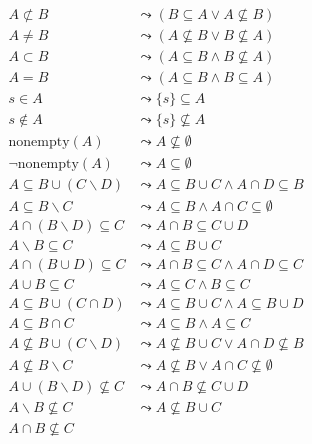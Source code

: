 \documentclass{article}
\begin{document}
\begin{figure}[htbp]
\begin{center}
\begin{align*}
A \not\subset B &\leadsto (B \subseteq A \lor A \not\subseteq B) \\
A \not= B       &\leadsto (A \not\subseteq B \lor B \not\subseteq A) \\
A \subset B     &\leadsto (A \subseteq B \land B \not\subseteq A) \\
A = B           &\leadsto (A \subseteq B \land B \subseteq A) \\
s \in A         &\leadsto \{ s \} \subseteq A \\
s \not\in A     &\leadsto \{ s \} \not\subseteq A \\
\text{nonempty}(A)          &\leadsto A \not\subseteq \emptyset \\
\lnot \text{nonempty}(A)    &\leadsto A \subseteq \emptyset \\
A \subseteq B \cup (C \backslash D)
    &\leadsto A \subseteq B \cup C \land A \cap D \subseteq B \\
A \subseteq B \backslash C
    &\leadsto A \subseteq B \land A \cap C \subseteq \emptyset \\
A \cap (B \backslash D) \subseteq C
    &\leadsto A \cap B \subseteq C \cup D \\
A \backslash B \subseteq C
    &\leadsto A \subseteq B \cup C \\
A \cap (B \cup D) \subseteq C
    & \leadsto A \cap B \subseteq C \land A \cap D \subseteq C \\
A \cup B \subseteq C
    & \leadsto A \subseteq C \land B \subseteq C \\
A \subseteq B \cup (C \cap D)
    & \leadsto A \subseteq B \cup C \land A \subseteq B \cup D \\
A \subseteq B \cap C
    & \leadsto A \subseteq B \land A \subseteq C \\
A \not\subseteq B \cup (C \backslash D)
    &\leadsto A \not\subseteq B \cup C \lor A \cap D \not\subseteq B \\
A \not\subseteq B \backslash C
    &\leadsto A \not\subseteq B \lor A \cap C \not\subseteq \emptyset \\
A \cup (B \backslash D) \not\subseteq C
    &\leadsto A \cap B \not\subseteq C \cup D \\
A \backslash B \not\subseteq C
    &\leadsto A \not\subseteq B \cup C \\  %
A \cap B \not\subseteq C

\end{align*}
\end{center}
\end{figure}
\end{document}
